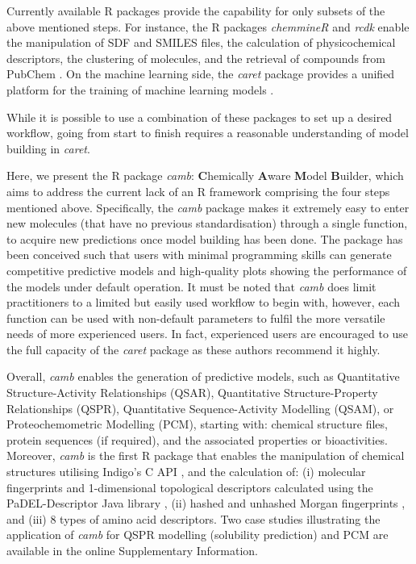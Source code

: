 \documentclass[twoside,a4wide,10pt]{article}
\begin{document}
Currently available R packages provide the capability for only subsets of the above mentioned steps.
For instance, the R packages {\it chemmineR} \citep{chemmineR} and {\it rcdk} \citep{rcdk} enable the manipulation of SDF and SMILES
files, the calculation of physicochemical descriptors, the clustering of molecules,
and the retrieval of compounds from PubChem \citep{pubchem}.
On the machine learning side, the {\it caret} package provides a
unified platform for the training of machine learning models \citep{caret}.

While it is possible to use a combination of these packages to set up a desired workflow, going from start to finish requires a reasonable understanding of model building in {\it caret}. 

Here, we present the R package {\it camb}: {\bf C}hemically {\bf A}ware {\bf M}odel {\bf B}uilder, which aims to address the current lack of an R framework comprising the four steps mentioned above. 
Specifically, the {\it camb} package makes it extremely easy to enter new molecules (that have no previous standardisation) through a single function, to acquire new predictions once model building has been done.
The package has been conceived such that users with minimal programming skills can generate competitive predictive models and high-quality plots showing the performance of the models under default operation.
It must be noted that {\it camb} does limit practitioners to a limited but easily used workflow to begin with, however, each function can be used with non-default parameters to fulfil the more versatile needs of more experienced users. 
In fact, experienced users are encouraged to use the full capacity of the {\it caret} package as these authors recommend it highly.

Overall, {\it camb} enables the generation of predictive  models,
such as 
Quantitative Structure-Activity Relationships (QSAR), 
Quantitative Structure-Property Relationships (QSPR), 
Quantitative Sequence-Activity Modelling (QSAM), 
or Proteochemometric Modelling (PCM),
starting with: chemical structure files, protein sequences (if required), and the associated properties or bioactivities.
Moreover, {\it camb} is the first R package that enables the manipulation of chemical structures utilising Indigo's C API \citep{Indigo},
and the calculation of:
(i) molecular fingerprints and 1-dimensional \citep{Rognan} topological 
descriptors calculated using the PaDEL-Descriptor Java library \citep{padel},
(ii) hashed and unhashed Morgan fingerprints \citep{extended_fp},
and (iii) 8 types of amino acid descriptors. 
Two case studies illustrating the application of {\it camb} for
QSPR modelling (solubility prediction) and PCM are available in the online Supplementary Information.
\end{document}
